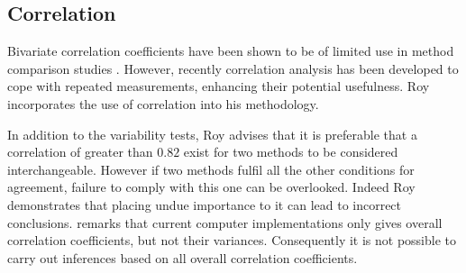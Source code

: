 \documentclass[12pt, a4paper]{report}
\theoremstyle{plain}
\theoremstyle{definition}
\theoremstyle{remark}
\begin{document}
\subsection{Correlation}


Bivariate correlation coefficients have been shown to be of
limited use in method comparison studies \citep{BA86}. However,
recently correlation analysis has been developed to cope with
repeated measurements, enhancing their potential usefulness. Roy
incorporates the use of correlation into his methodology.

In addition to the variability tests, Roy advises that it is preferable that a correlation of greater than $0.82$ exist for two methods to be considered interchangeable. However if two methods fulfil all the other conditions for agreement, failure to comply with this one can be overlooked. Indeed Roy demonstrates that placing undue importance to it can lead to incorrect conclusions. \citet{ARoy2009} remarks that current computer implementations only gives overall correlation coefficients, but not their variances. Consequently it is not possible to carry out inferences based on all overall correlation coefficients.
\end{document}
